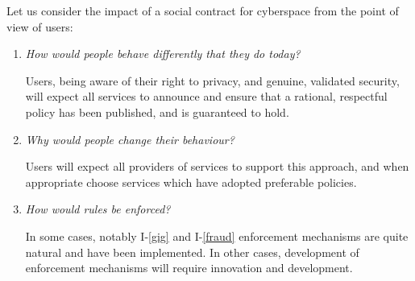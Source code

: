 Let us consider the impact of a social contract for cyberspace from the
point of view of users:
\begin{enumerate}[1.]
\item  {\em How would people behave differently that they do today?}

Users, being aware of their right to privacy, and genuine, validated security,
will expect all services to announce and ensure that a rational, respectful policy
has been published, and is guaranteed to hold.

\item  {\em Why would people change their behaviour?}

Users will expect all providers of services to support this approach, and when
appropriate choose services which have adopted preferable policies.


\item  {\em How would rules be enforced?}

In some cases, notably I-\ref{gig}
and I-\ref{fraud} enforcement mechanisms are quite natural
and have been implemented. In other cases, development of enforcement mechanisms
will require innovation and development.

\end{enumerate}

